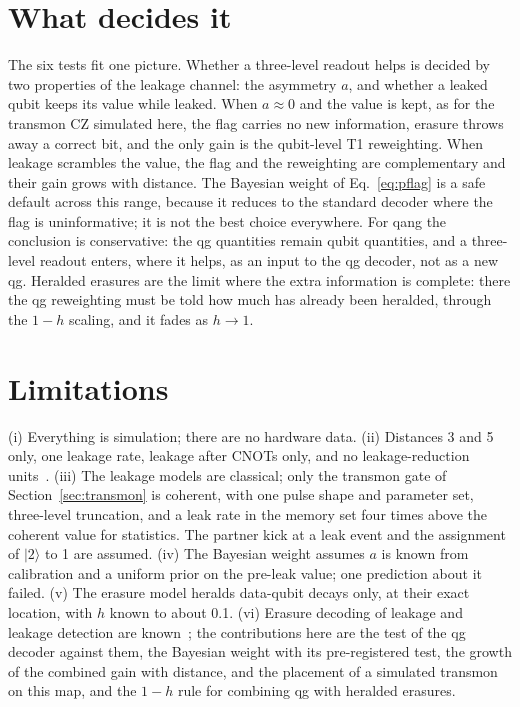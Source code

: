 \documentclass[11pt]{article}
\begin{document}
\section{What decides it}

The six tests fit one picture. Whether a three-level readout helps is decided by two properties of
the leakage channel: the asymmetry $a$, and whether a leaked qubit keeps its value while leaked. When
$a\approx0$ and the value is kept, as for the transmon CZ simulated here, the flag carries no new
information, erasure throws away a correct bit, and the only gain is the qubit-level T1 reweighting.
When leakage scrambles the value, the flag and the reweighting are complementary and their gain grows
with distance. The Bayesian weight of Eq.~\eqref{eq:pflag} is a safe default across this range, because
it reduces to the standard decoder where the flag is uninformative; it is not the best choice
everywhere. For qang the conclusion is conservative: the qg quantities remain qubit quantities, and a
three-level readout enters, where it helps, as an input to the qg decoder, not as a new qg. Heralded
erasures are the limit where the extra information is complete: there the qg reweighting must be told
how much has already been heralded, through the $1-h$ scaling, and it fades as $h\to1$.

\section{Limitations}

(i) Everything is simulation; there are no hardware data. (ii) Distances 3 and 5 only, one leakage
rate, leakage after CNOTs only, and no leakage-reduction units~\cite{mcewen2021leakage}. (iii) The
leakage models are classical; only the transmon gate of Section~\ref{sec:transmon} is coherent, with
one pulse shape and parameter set, three-level truncation, and a leak rate in the memory set four
times above the coherent value for statistics. The partner kick at a leak event and the assignment of
$|2\rangle$ to 1 are assumed. (iv) The Bayesian weight assumes $a$ is known from calibration and a
uniform prior on the pre-leak value; one prediction about it failed. (v) The erasure model heralds
data-qubit decays only, at their exact location, with $h$ known to about 0.1. (vi) Erasure decoding of leakage
and leakage detection are known~\cite{suchara2015leakage,wu2022erasure,varbanov2020leakage}; the
contributions here are the test of the qg decoder against them, the Bayesian weight with its
pre-registered test, the growth of the combined gain with distance, and the placement of a simulated
transmon on this map, and the $1-h$ rule for combining qg with heralded erasures.
\end{document}

